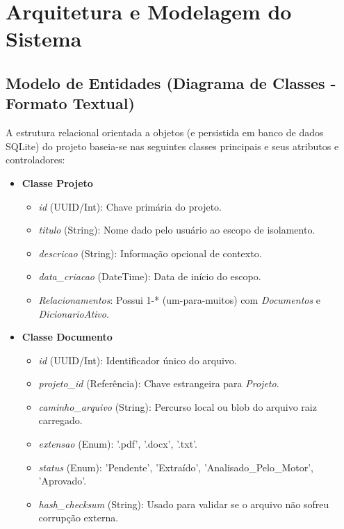 \documentclass{scrreprt}
\begin{document}
\chapter{Arquitetura e Modelagem do Sistema}

\section{Modelo de Entidades (Diagrama de Classes - Formato Textual)}

A estrutura relacional orientada a objetos (e persistida em banco de dados SQLite) do projeto baseia-se nas seguintes classes principais e seus atributos e controladores:

\begin{itemize}
    \item \textbf{Classe Projeto}
    \begin{itemize}
        \item \textit{id} (UUID/Int): Chave primária do projeto.
        \item \textit{titulo} (String): Nome dado pelo usuário ao escopo de isolamento.
        \item \textit{descricao} (String): Informação opcional de contexto.
        \item \textit{data\_criacao} (DateTime): Data de início do escopo.
        \item \textit{Relacionamentos}: Possui 1-* (um-para-muitos) com \textit{Documentos} e \textit{DicionarioAtivo}.
    \end{itemize}

    \item \textbf{Classe Documento}
    \begin{itemize}
        \item \textit{id} (UUID/Int): Identificador único do arquivo.
        \item \textit{projeto\_id} (Referência): Chave estrangeira para \textit{Projeto}.
        \item \textit{caminho\_arquivo} (String): Percurso local ou blob do arquivo raiz carregado.
        \item \textit{extensao} (Enum): '.pdf', '.docx', '.txt'.
        \item \textit{status} (Enum): 'Pendente', 'Extraído', 'Analisado\_Pelo\_Motor', 'Aprovado'.
        \item \textit{hash\_checksum} (String): Usado para validar se o arquivo não sofreu corrupção externa.
    \end{itemize}


\end{itemize}
\end{document}
